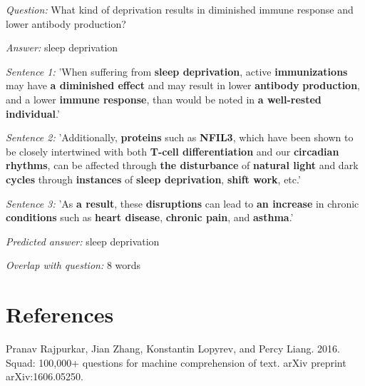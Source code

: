 \documentclass[a4paper, 11pt]{article} %
\begin{document}
\textit{Question:}  What kind of deprivation results in diminished immune response and lower antibody production? \bigskip 

\textit{Answer:} sleep deprivation \bigskip

\textit{Sentence 1:} 'When suffering from \textbf{sleep deprivation}, active \textbf{immunizations} may have \textbf{a diminished effect} and may result in lower \textbf{antibody} \textbf{production}, and a lower \textbf{immune response}, than would be noted in \textbf{a well-rested individual}.' \bigskip

\textit{Sentence 2:} 'Additionally, \textbf{proteins} such as \textbf{NFIL3}, which have been shown to be closely intertwined with both \textbf{T-cell differentiation} and our \textbf{circadian rhythms}, can be affected through \textbf{the disturbance} of \textbf{natural light} and dark \textbf{cycles} through \textbf{instances} of \textbf{sleep deprivation}, \textbf{shift work}, etc.' \bigskip

\textit{Sentence 3:} 'As \textbf{a result}, these \textbf{disruptions} can lead to \textbf{an increase} in chronic \textbf{conditions} such as \textbf{heart disease}, \textbf{chronic pain}, and \textbf{asthma}.' \bigskip

\textit{Predicted answer:} sleep deprivation \bigskip

\textit{Overlap with question:} 8 words


\section*{References}

Pranav Rajpurkar, Jian Zhang, Konstantin Lopyrev, and
Percy Liang. 2016. \hspace*{1em} Squad: 100,000+ questions
for machine comprehension of text. arXiv \hspace*{1em} preprint
arXiv:1606.05250.
\end{document}
